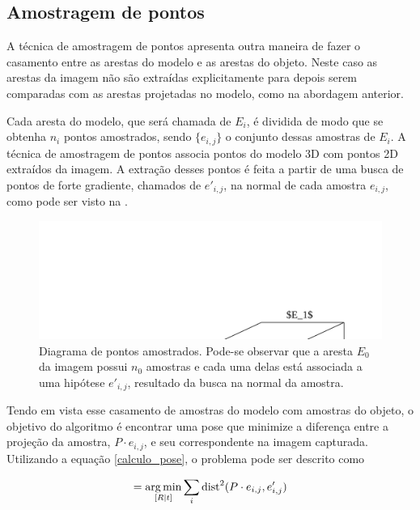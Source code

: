 \subsection{Amostragem de pontos}

A técnica de amostragem de pontos \cite{drummondecipolla} apresenta outra maneira de fazer o casamento entre as arestas do modelo e as arestas do objeto. Neste caso as arestas da imagem não são extraídas explicitamente para depois serem comparadas com as arestas projetadas no modelo, como na abordagem anterior.

Cada aresta do modelo, que será chamada de $E_i$, é dividida de modo que se obtenha $n_i$ pontos amostrados, sendo $\{e_{i,j}\}$ o conjunto dessas amostras de $E_i$. A técnica de amostragem de pontos associa pontos do modelo 3D com pontos 2D extraídos da imagem. A extração desses pontos é feita a partir de uma busca de pontos de forte gradiente, chamados de $e'_{i,j}$, na normal de cada amostra $e_{i,j}$, como pode ser visto na .

\begin{figure}[!ht]
\centering\includegraphics{monografia/sample_point_diagram}
\caption{Diagrama de pontos amostrados. Pode-se observar que a aresta $E_0$ da imagem possui $n_0$ amostras e cada uma delas está associada a uma hipótese $e'_{i,j}$, resultado da busca na normal da amostra.}
\label{amostragem_de_pontos}
\end{figure}

Tendo em vista esse casamento de amostras do modelo com amostras do objeto, o objetivo do algoritmo é encontrar uma pose que minimize a diferença entre a projeção da amostra, $P \cdot e_{i,j}$, e seu correspondente na imagem capturada. Utilizando a equação \eqref{calculo_pose}, o problema pode ser descrito como

\begin{equation}
[R | t] = \argmin_{[R | t]} \sum_i \text{dist}^2(P \cdot e_{i,j}, e'_{i,j})
\label{calculo_pose_amostragem}
\end{equation}

